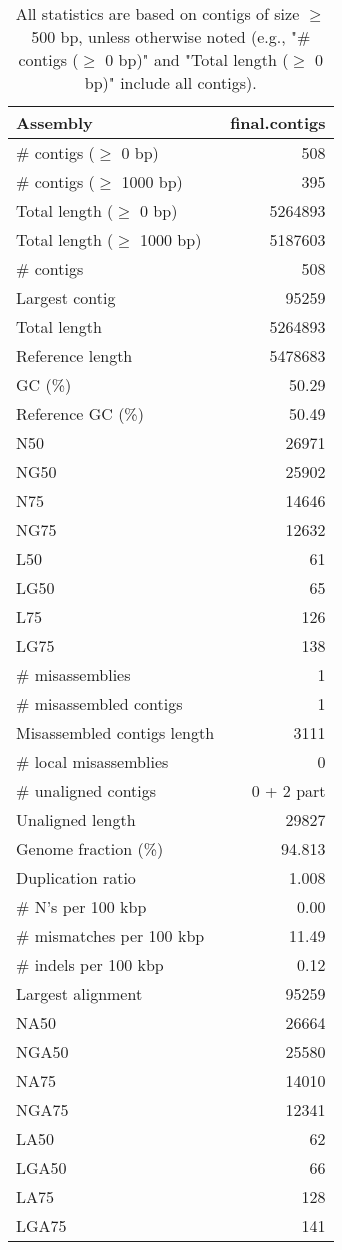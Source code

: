 \documentclass[12pt,a4paper]{article}
\begin{document}
\begin{table}[ht]
\begin{center}
\caption{All statistics are based on contigs of size $\geq$ 500 bp, unless otherwise noted (e.g., "\# contigs ($\geq$ 0 bp)" and "Total length ($\geq$ 0 bp)" include all contigs).}
\begin{tabular}{|l*{1}{|r}|}
\hline
Assembly & final.contigs \\ \hline
\# contigs ($\geq$ 0 bp) & 508 \\ \hline
\# contigs ($\geq$ 1000 bp) & 395 \\ \hline
Total length ($\geq$ 0 bp) & 5264893 \\ \hline
Total length ($\geq$ 1000 bp) & 5187603 \\ \hline
\# contigs & 508 \\ \hline
Largest contig & 95259 \\ \hline
Total length & 5264893 \\ \hline
Reference length & 5478683 \\ \hline
GC (\%) & 50.29 \\ \hline
Reference GC (\%) & 50.49 \\ \hline
N50 & 26971 \\ \hline
NG50 & 25902 \\ \hline
N75 & 14646 \\ \hline
NG75 & 12632 \\ \hline
L50 & 61 \\ \hline
LG50 & 65 \\ \hline
L75 & 126 \\ \hline
LG75 & 138 \\ \hline
\# misassemblies & 1 \\ \hline
\# misassembled contigs & 1 \\ \hline
Misassembled contigs length & 3111 \\ \hline
\# local misassemblies & 0 \\ \hline
\# unaligned contigs & 0 + 2 part \\ \hline
Unaligned length & 29827 \\ \hline
Genome fraction (\%) & 94.813 \\ \hline
Duplication ratio & 1.008 \\ \hline
\# N's per 100 kbp & 0.00 \\ \hline
\# mismatches per 100 kbp & 11.49 \\ \hline
\# indels per 100 kbp & 0.12 \\ \hline
Largest alignment & 95259 \\ \hline
NA50 & 26664 \\ \hline
NGA50 & 25580 \\ \hline
NA75 & 14010 \\ \hline
NGA75 & 12341 \\ \hline
LA50 & 62 \\ \hline
LGA50 & 66 \\ \hline
LA75 & 128 \\ \hline
LGA75 & 141 \\ \hline
\end{tabular}
\end{center}
\end{table}
\end{document}
